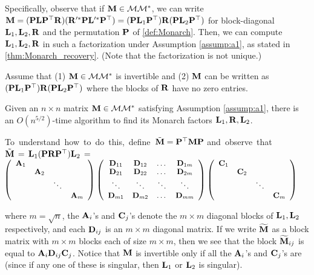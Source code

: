Specifically, observe that if $\mathbf{M} \in \mathcal{M}\mathcal{M}^*$, we can write $\mathbf{M} = (\mathbf{P}\mathbf{L} \mathbf{P}^\top \mathbf{R}) (\mathbf{R}'^* \mathbf{P}\mathbf{L}'^* \mathbf{P}^\top) = (\mathbf{P}\mathbf{L}_1\mathbf{P}^\top) \mathbf{R} (\mathbf{P}\mathbf{L}_2\mathbf{P}^\top)$ for block-diagonal $\mathbf{L}_1,\mathbf{L}_2,\mathbf{R}$ and the permutation $\mathbf{P}$ of \cref{def:Monarch}.
Then, we can compute $\mathbf{L}_1,\mathbf{L}_2,\mathbf{R}$ in such a factorization under Assumption \ref{assump:a1}, as stated in \cref{thm:Monarch_recovery}.  (Note that the factorization is not unique.)
\begin{assumption}
\label{assump:a1}
Assume that (1) $\mathbf{M} \in \mathcal{M}\mathcal{M}^*$ is invertible and (2) $\mathbf{M}$ can be written as $(\mathbf{P}\mathbf{L}_1\mathbf{P}^\top)\mathbf{R}(\mathbf{P}\mathbf{L}_2\mathbf{P}^\top)$ where the blocks of $\mathbf{R}$ have no zero entries.%
\end{assumption}%

\begin{theorem}\label{thm:Monarch_recovery}
Given an $n \times n$ matrix $\mathbf{M} \in \mathcal{M}\mathcal{M}^*$ satisfying Assumption \ref{assump:a1}, there is an $O(n^{5/2})$-time algorithm to find its Monarch factors $\mathbf{L}_1, \mathbf{R}, \mathbf{L}_2$.
\end{theorem}

\mbox{To understand how to do this, define $\tilde{\mathbf{M}} = \mathbf{P}^\top \mathbf{M}\mathbf{P}$} \mbox{and observe that $\tilde{\mathbf{M}}\, = \, \mathbf{L}_1 (\mathbf{P}\mathbf{R}\mathbf{P}^\top) \mathbf{L}_2 \, =$} \newline
{
\setlength\arraycolsep{1.2pt}
${}\hspace{-0.35em}\small \lt \begin{array}{ccccc} \vA_1 \\ & \vA_2 \\ & & \ddots \\ & & & \vA_{m} \end{array}\rt
\lt \begin{array}{cccc} \vD_{11} & \vD_{12} & \dots & \vD_{1m} \\ \vD_{21} & \vD_{22} & \dots & \vD_{2m} \\ \ddots & \ddots & \ddots & \ddots  \\ \vD_{m1} & \vD_{m2} & \dots & \vD_{mm} \end{array}\rt
\lt \begin{array}{ccccc} \vC_1 \\ & \vC_2 \\ & & \ddots \\ & & & \vC_{m} \end{array}\rt$
}

where $m = \sqrt{n}$, the $\mathbf{A}_i$'s and $\mathbf{C}_j$'s denote the $m \times m$ diagonal blocks of $\mathbf{L}_1,\mathbf{L}_2$ respectively, and each $\mathbf{D}_{ij}$ is an $m \times m$ diagonal matrix. If we write $\widetilde{\mathbf{M}}$ as a block matrix with $m \times m$ blocks each of size $m \times m$, then we see that the block $\widetilde{\mathbf{M}}_{ij}$ is equal to $\mathbf{A}_i \mathbf{D}_{ij} \mathbf{C}_j$. Notice that $\mathbf{M}$ is invertible only if all the $\mathbf{A}_i$'s and $\mathbf{C}_j$'s are (since if any one of these is singular, then $\mathbf{L}_1$ or $\mathbf{L}_2$ is singular).

